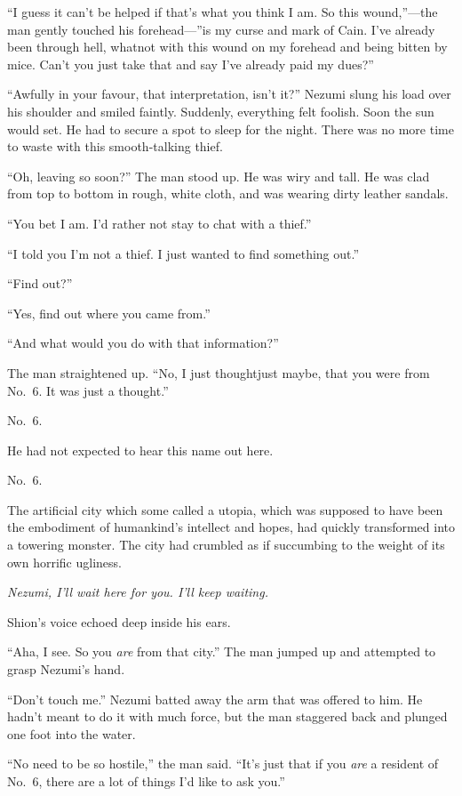 ``I guess it can't be helped if that's what you think I am. So this
wound,''---the man gently touched his forehead---''is my curse and mark of
Cain. I've already been through hell, whatnot with this wound on my
forehead and being bitten by mice. Can't you just take that and say I've
already paid my dues?''

``Awfully in your favour, that interpretation, isn't it?'' Nezumi slung
his load over his shoulder and smiled faintly. Suddenly, everything felt
foolish. Soon the sun would set. He had to secure a spot to sleep for
the night. There was no more time to waste with this smooth-talking
thief.

``Oh, leaving so soon?'' The man stood up. He was wiry and tall. He was
clad from top to bottom in rough, white cloth, and was wearing dirty
leather sandals.

``You bet I am. I'd rather not stay to chat with a thief.''

``I told you I'm not a thief. I just wanted to find something out.''

``Find out?''

``Yes, find out where you came from.''

``And what would you do with that information?''

The man straightened up. ``No, I just thought\el just maybe, that you
were from No.~6. It was just a thought.''

No.~6.

He had not expected to hear this name out here.

No.~6.

The artificial city which some called a utopia, which was supposed to
have been the embodiment of humankind's intellect and hopes, had quickly
transformed into a towering monster. The city had crumbled as if
succumbing to the weight of its own horrific ugliness.

\emph{Nezumi, I'll wait here for you. I'll keep waiting.}

Shion's voice echoed deep inside his ears.

``Aha, I see. So you \emph{are} from that city.'' The man jumped up and
attempted to grasp Nezumi's hand.

``Don't touch me.'' Nezumi batted away the arm that was offered to him.
He hadn't meant to do it with much force, but the man staggered back and
plunged one foot into the water.

``No need to be so hostile,'' the man said. ``It's just that if you \emph{are}
a resident of No.~6, there are a lot of things I'd like to ask you.''

